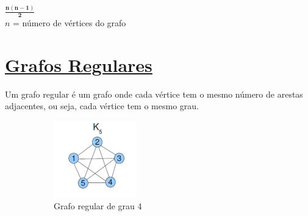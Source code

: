 \documentclass{article}
\begin{document}
	\begin{center}
			{\Large ${ \mathbf{\frac{n(n-1)}{2}}}$}\\
			\vspace*{0.2cm}
			$n$ = número de vértices do grafo 
	\end{center}

	\section{{\Large \underline{Grafos Regulares}}}
		Um grafo regular é um grafo onde cada vértice tem o mesmo número de arestas adjacentes, ou seja, cada vértice tem o mesmo grau.
		
		\begin{figure}[H]
			\centering
			\begin{subfigure}{0.26\textwidth}
				\centering
				\includegraphics[width = \textwidth]{"Figuras/regular1"}
				\caption{Grafo regular de grau 4}
				\label{fig:regular1esq}
			\end{subfigure}
			\quad
			\quad
			\begin{subfigure}{0.25\textwidth}
				\centering

\end{subfigure}
\end{figure}
\end{document}
